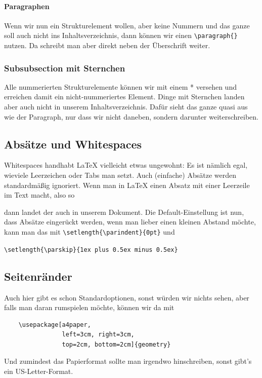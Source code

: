 \documentclass[a4paper]{article}
\begin{document}
\paragraph{Paragraphen}
Wenn wir nun ein Strukturelement wollen, aber keine Nummern und das ganze soll
auch nicht ins Inhaltsverzeichnis, dann können wir einen \verb|\paragraph{}|
nutzen.
Da schreibt man aber direkt neben der Überschrift weiter.

\subsubsection*{Subsubsection mit Sternchen}
Alle nummerierten Strukturelemente können wir mit einem * versehen und
erreichen damit ein nicht-nummeriertes Element.
Dinge mit Sternchen landen aber auch nicht in unserem Inhaltsverzeichnis.
Dafür sieht das ganze quasi aus wie der Paragraph, nur dass wir nicht daneben,
sondern darunter weiterschreiben.

\subsection{Absätze und Whitespaces}
Whitespaces handhabt \LaTeX{} vielleicht etwas ungewohnt: Es ist nämlich egal,
wieviele Leerzeichen oder Tabs man        setzt.  Auch (einfache) Absätze
werden standardmäßig ignoriert.
Wenn man in \LaTeX{} einen Absatz mit einer Leerzeile im Text macht, also so

dann landet der auch in unserem Dokument. 
Die Default-Einstellung ist nun, dass Absätze eingerückt werden, wenn man
lieber einen kleinen Abstand möchte, kann man das mit
\verb|\setlength{\parindent}{0pt}| und

\verb|\setlength{\parskip}{1ex plus 0.5ex minus 0.5ex}|


\subsection{Seitenränder}
Auch hier gibt es schon Standardoptionen, sonst würden wir nichts sehen, aber
falls man daran rumspielen möchte, können wir da mit
\begin{center}
  \begin{verbatim}
    \usepackage[a4paper,
                left=3cm, right=3cm,
                top=2cm, bottom=2cm]{geometry}
  \end{verbatim}
\end{center}
Und zumindest das Papierformat sollte man irgendwo hinschreiben, sonst gibt's
ein US-Letter-Format.
\end{document}
